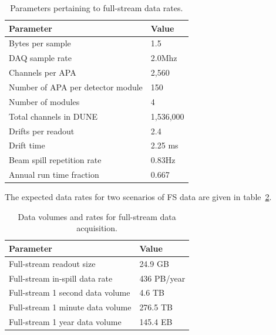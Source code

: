 \begin{table}[ht!]
	\centering
	\begin{tabular}{| p{3in} | p{2.5in} |}
		\hline

	\textbf{Parameter} & \textbf{Value} \\ \hline
	
	Bytes per sample & 1.5 \\ \hline
	
	DAQ sample rate & 2.0Mhz \\ \hline
	
	Channels per APA & 2,560 \\ \hline
	
	Number of APA per detector module & 150 \\ \hline
	
	Number of modules & 4 \\ \hline
	
	Total channels in DUNE & 1,536,000 \\ \hline
	
	Drifts per readout & 2.4 \\ \hline
	
	Drift time & 2.25 ms \\ \hline
	
	Beam spill repetition rate & 0.83Hz \\ \hline
	
	Annual run time fraction & 0.667 \\ \hline
	\end{tabular}
	\caption{Parameters pertaining to full-stream data rates.}
	\label{tab:full-stream-parameters}
\end{table}
The expected data rates for two scenarios of FS data are given
in table~\ref{tab:full-stream-volume}.
\begin{table}[ht!]
	\centering
	\begin{tabular}{| p{3in} | p{2.5in} |}
		\hline	
	
	\textbf{Parameter} & \textbf{Value} \\ \hline
	Full-stream readout size & 24.9 GB \\ \hline
	Full-stream in-spill data rate & 436 PB/year \\ \hline
	Full-stream 1 second data volume & 4.6 TB \\
	Full-stream 1 minute data volume & 276.5 TB \\	\hline
	Full-stream 1 year data volume & 145.4 EB \\ \hline
	\end{tabular}
	\caption{Data volumes and rates for full-stream data acquisition.}
	\label{tab:full-stream-volume}
\end{table}
